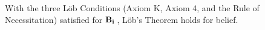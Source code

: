 With the three L\"ob Conditions (Axiom K, Axiom 4, and the Rule of Necessitation) satisfied for $\mathbf{B}_{\mathbf{i}}\,$, L\"ob's Theorem holds for belief. 
%
%
%		
%
%
